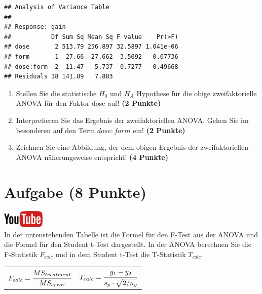 \documentclass[a4paper, 10pt]{scrartcl}\usepackage[]{graphicx}\usepackage[]{xcolor}
\makeatletter
\newenvironment{kframe}{%
 \def\at@end@of@kframe{}%
 \ifinner\ifhmode%
  \def\at@end@of@kframe{\end{minipage}}%
  \begin{minipage}{\columnwidth}%
 \fi\fi%
 \def\FrameCommand##1{\hskip\@totalleftmargin \hskip-\fboxsep
 \colorbox{shadecolor}{##1}\hskip-\fboxsep
     \hskip-\linewidth \hskip-\@totalleftmargin \hskip\columnwidth}%
 \MakeFramed {\advance\hsize-\width
   \@totalleftmargin\z@ \linewidth\hsize
   \@setminipage}}%
 {\par\unskip\endMakeFramed%
 \at@end@of@kframe}
\newenvironment{knitrout}{}{} %
\makeatother
\begin{document}
\begin{knitrout}
\color{fgcolor}\begin{kframe}
\begin{verbatim}
## Analysis of Variance Table
## 
## Response: gain
##           Df Sum Sq Mean Sq F value    Pr(>F)
## dose       2 513.79 256.897 32.5897 1.041e-06
## form       1  27.66  27.662  3.5092   0.07736
## dose:form  2  11.47   5.737  0.7277   0.49668
## Residuals 18 141.89   7.883
\end{verbatim}
\end{kframe}
\end{knitrout}

\begin{enumerate}
\item Stellen Sie die statistische $H_0$ und $H_A$ Hypothese f{\"u}r die obige
  zweifaktorielle ANOVA f{\"u}r den Faktor dose
  auf! \textbf{(2 Punkte)}
\item Interpretieren Sie das Ergebnis der zweifaktoriellen ANOVA. Gehen Sie
  im besonderen auf den Term $dose:form$ ein! \textbf{(2 Punkte)}
\item Zeichnen Sie eine Abbildung, der dem obigen Ergebnis der
  zweifaktoriellen ANOVA n{\"a}herungsweise entspricht! \textbf{(4 Punkte)}
\end{enumerate}
 
\clearpage

\section{Aufgabe \hfill (8 Punkte)}


\hfill\href{https://youtu.be/FjjJXkFJfIY}{\includegraphics[width =
  2cm]{img/youtube}}\\[1Ex]


In der untenstehenden Tabelle ist die Formel f{\"u}r den F-Test aus der ANOVA
und die Formel f{\"u}r den Student t-Test dargestellt. In der ANOVA berechnen
Sie die F-Statistik $F_{calc}$ und in dem Student t-Test die T-Statistik
$T_{calc}$.

\begin{center}
  \begin{tabular}{cc}
    $F_{calc} = \cfrac{MS_{treatment}}{MS_{error}}$ & $T_{calc} = \cfrac{\bar{y}_1 - \bar{y}_2}{s_p \cdot \sqrt{2/n_g}}$\\
  \end{tabular}
\end{center}
\end{document}
